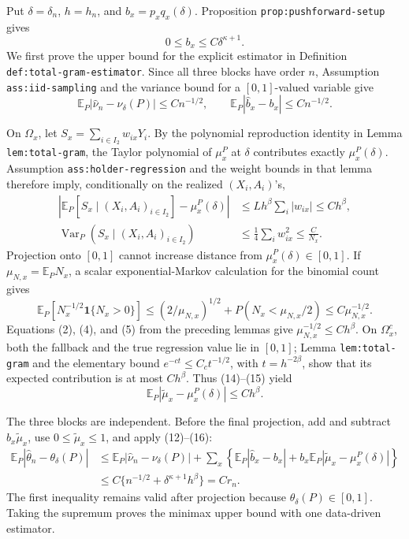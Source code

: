 Put \(\delta=\delta_n\), \(h=h_n\), and \(b_x=p_xq_x(\delta)\).  Proposition \texttt{prop:pushforward-setup} gives
\[
 0\leq b_x\leq C\delta^{\kappa+1}. \tag{12}
\]
We first prove the upper bound for the explicit estimator in Definition \texttt{def:total-gram-estimator}.  Since all three blocks have order \(n\), Assumption \texttt{ass:iid-sampling} and the variance bound for a \([0,1]\)-valued variable give
\[
 \mathbb E_P|\widehat\nu_n-\nu_\delta(P)|\leq Cn^{-1/2},
 \qquad
 \mathbb E_P|\widehat b_x-b_x|\leq Cn^{-1/2}. \tag{13}
\]

On \(\Omega_x\), let \(S_x=\sum_{i\in I_2}w_{ix}Y_i\).  By the polynomial reproduction identity in Lemma \texttt{lem:total-gram}, the Taylor polynomial of \(\mu_x^P\) at \(\delta\) contributes exactly \(\mu_x^P(\delta)\).  Assumption \texttt{ass:holder-regression} and the weight bounds in that lemma therefore imply, conditionally on the realized \((X_i,A_i)\)'s,
\[
 \begin{aligned}
 \left|\mathbb E_P[S_x\mid (X_i,A_i)_{i\in I_2}]-\mu_x^P(\delta)\right|
 &\leq Lh^\beta\sum_i|w_{ix}|\leq Ch^\beta,\\
 \operatorname{Var}_P(S_x\mid (X_i,A_i)_{i\in I_2})
 &\leq\frac14\sum_iw_{ix}^2\leq\frac{C}{N_x}. 
 \end{aligned} \tag{14}
\]
Projection onto \([0,1]\) cannot increase distance from \(\mu_x^P(\delta)\in[0,1]\).  If \(\mu_{N,x}=\mathbb E_PN_x\), a scalar exponential-Markov calculation for the binomial count gives
\[
 \mathbb E_P\left[N_x^{-1/2}\mathbf 1\{N_x>0\}\right]
 \leq (2/\mu_{N,x})^{1/2}+P(N_x<\mu_{N,x}/2)
 \leq C\mu_{N,x}^{-1/2}. \tag{15}
\]
Equations (2), (4), and (5) from the preceding lemmas give \(\mu_{N,x}^{-1/2}\leq Ch^\beta\).  On \(\Omega_x^c\), both the fallback and the true regression value lie in \([0,1]\); Lemma \texttt{lem:total-gram} and the elementary bound \(e^{-ct}\leq C_ct^{-1/2}\), with \(t=h^{-2\beta}\), show that its expected contribution is at most \(Ch^\beta\).  Thus (14)--(15) yield
\[
 \mathbb E_P|\widetilde\mu_x-\mu_x^P(\delta)|\leq Ch^\beta. \tag{16}
\]

The three blocks are independent.  Before the final projection, add and subtract \(b_x\widetilde\mu_x\), use \(0\leq\widetilde\mu_x\leq1\), and apply (12)--(16):
\[
 \begin{aligned}
 \mathbb E_P|\widehat\theta_n-\theta_\delta(P)|
 &\leq \mathbb E_P|\widehat\nu_n-\nu_\delta(P)|
 +\sum_x\left\{\mathbb E_P|\widehat b_x-b_x|
 +b_x\mathbb E_P|\widetilde\mu_x-\mu_x^P(\delta)|\right\}\\
 &\leq C\{n^{-1/2}+\delta^{\kappa+1}h^\beta\}=Cr_n.
\end{aligned} \tag{17}
\]
The first inequality remains valid after projection because \(\theta_\delta(P)\in[0,1]\).  Taking the supremum proves the minimax upper bound with one data-driven estimator.

